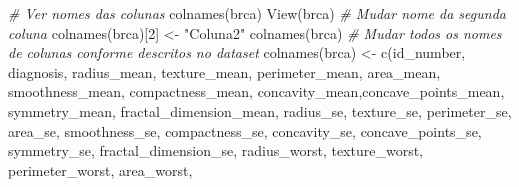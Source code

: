 \documentclass[
]{book}
\newenvironment{Shaded}{\begin{snugshade}}{\end{snugshade}}
\newcommand{\CommentTok}[1]{\textcolor[rgb]{0.56,0.35,0.01}{\textit{#1}}}
\newcommand{\DecValTok}[1]{\textcolor[rgb]{0.00,0.00,0.81}{#1}}
\newcommand{\FunctionTok}[1]{\textcolor[rgb]{0.00,0.00,0.00}{#1}}
\newcommand{\NormalTok}[1]{#1}
\newcommand{\OtherTok}[1]{\textcolor[rgb]{0.56,0.35,0.01}{#1}}
\newcommand{\StringTok}[1]{\textcolor[rgb]{0.31,0.60,0.02}{#1}}
\begin{document}
\begin{Shaded}
\begin{Highlighting}[]
\CommentTok{\# Ver nomes das colunas}
\FunctionTok{colnames}\NormalTok{(brca)}
\FunctionTok{View}\NormalTok{(brca)}
\CommentTok{\# Mudar nome da segunda coluna}
\FunctionTok{colnames}\NormalTok{(brca)[}\DecValTok{2}\NormalTok{] }\OtherTok{\textless{}{-}} \StringTok{"Coluna2"}
\FunctionTok{colnames}\NormalTok{(brca)}
\CommentTok{\# Mudar todos os nomes de colunas conforme descritos no dataset}
\FunctionTok{colnames}\NormalTok{(brca) }\OtherTok{\textless{}{-}} \FunctionTok{c}\NormalTok{(}\StringTok{\textquotesingle{}id\_number\textquotesingle{}}\NormalTok{, }\StringTok{\textquotesingle{}diagnosis\textquotesingle{}}\NormalTok{, }\StringTok{\textquotesingle{}radius\_mean\textquotesingle{}}\NormalTok{,}
                    \StringTok{\textquotesingle{}texture\_mean\textquotesingle{}}\NormalTok{, }\StringTok{\textquotesingle{}perimeter\_mean\textquotesingle{}}\NormalTok{, }\StringTok{\textquotesingle{}area\_mean\textquotesingle{}}\NormalTok{,}
                    \StringTok{\textquotesingle{}smoothness\_mean\textquotesingle{}}\NormalTok{, }\StringTok{\textquotesingle{}compactness\_mean\textquotesingle{}}\NormalTok{,}
                    \StringTok{\textquotesingle{}concavity\_mean\textquotesingle{}}\NormalTok{,}\StringTok{\textquotesingle{}concave\_points\_mean\textquotesingle{}}\NormalTok{,}
                    \StringTok{\textquotesingle{}symmetry\_mean\textquotesingle{}}\NormalTok{, }\StringTok{\textquotesingle{}fractal\_dimension\_mean\textquotesingle{}}\NormalTok{,}
                    \StringTok{\textquotesingle{}radius\_se\textquotesingle{}}\NormalTok{, }\StringTok{\textquotesingle{}texture\_se\textquotesingle{}}\NormalTok{, }\StringTok{\textquotesingle{}perimeter\_se\textquotesingle{}}\NormalTok{,}
                    \StringTok{\textquotesingle{}area\_se\textquotesingle{}}\NormalTok{, }\StringTok{\textquotesingle{}smoothness\_se\textquotesingle{}}\NormalTok{, }\StringTok{\textquotesingle{}compactness\_se\textquotesingle{}}\NormalTok{,}
                    \StringTok{\textquotesingle{}concavity\_se\textquotesingle{}}\NormalTok{, }\StringTok{\textquotesingle{}concave\_points\_se\textquotesingle{}}\NormalTok{,}
                    \StringTok{\textquotesingle{}symmetry\_se\textquotesingle{}}\NormalTok{, }\StringTok{\textquotesingle{}fractal\_dimension\_se\textquotesingle{}}\NormalTok{,}
                    \StringTok{\textquotesingle{}radius\_worst\textquotesingle{}}\NormalTok{, }\StringTok{\textquotesingle{}texture\_worst\textquotesingle{}}\NormalTok{,}
                    \StringTok{\textquotesingle{}perimeter\_worst\textquotesingle{}}\NormalTok{, }\StringTok{\textquotesingle{}area\_worst\textquotesingle{}}\NormalTok{,}

\end{Highlighting}
\end{Shaded}
\end{document}
